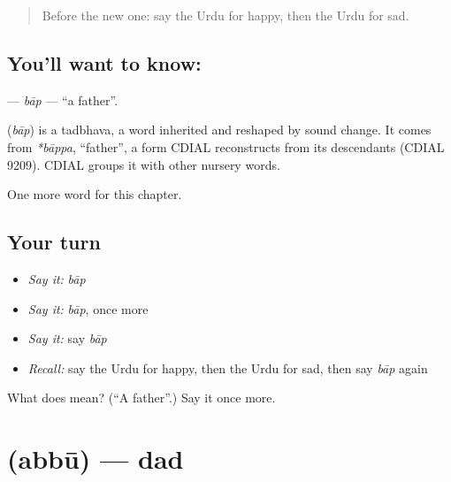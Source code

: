 \label{lesson:UR-C42-bap}



\begin{quote}
Before the new one: say the Urdu for happy, then the Urdu for sad.
\end{quote}

\subsection*{You'll want to know: }
\textbf{} — \emph{bāp} — \textquotedblleft{}a father\textquotedblright{}.

\begin{cousinweb}
\textbf{} (\emph{bāp}) is a tadbhava, a word inherited and reshaped by sound change. It comes from \emph{*bāppa}, \textquotedblleft{}father\textquotedblright{}, a form CDIAL reconstructs from its descendants (CDIAL 9209). CDIAL groups it with other nursery words.
\end{cousinweb}

\begin{grammarlens}[title={What you've built}]
One more word for this chapter.
\end{grammarlens}

\subsection*{Your turn}
\begin{itemize}
\raggedright
  \item \emph{Say it:} \emph{bāp}
  \item \emph{Say it:} \emph{bāp}, once more
  \item \emph{Say it:} say \emph{bāp}
  \item \emph{Recall:} say the Urdu for happy, then the Urdu for sad, then say \emph{bāp} again
\end{itemize}

\begin{tcolorbox}[breakable,colback=teal!4,colframe=teal!35!black,title={Before you move on}]
What does  mean? (\textquotedblleft{}A father\textquotedblright{}.) Say it once more.
\end{tcolorbox}
\section[\texorpdfstring{\ur{ابو} (abbū)}{ابو (abbū)}]{ (abbū) — dad}

\label{lesson:UR-C42-abbu}



